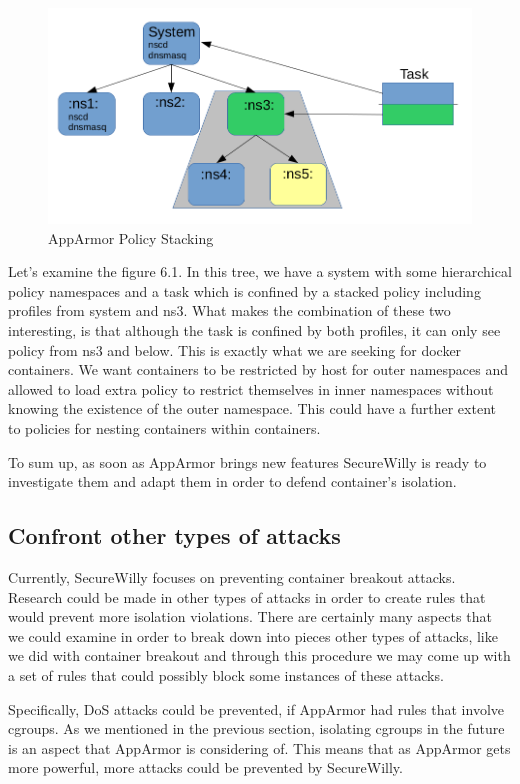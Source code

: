 \begin{figure}[h!]
  \centering
   \includegraphics[width=0.9\linewidth]{./figures/policystacking1.png}
   \caption{AppArmor Policy Stacking}
\end{figure}

Let's examine the figure 6.1. In this tree, we have a system with some hierarchical policy namespaces and a task which is confined by a stacked policy including profiles from system and ns3. What makes the combination of these two interesting, is that although the task is confined by both profiles, it can only see policy from ns3 and below. This is exactly what we are seeking for docker containers. We want containers to be restricted by host for outer namespaces and allowed to load extra policy to restrict themselves in inner namespaces without knowing the existence of the outer namespace.
This could have a further extent to policies for nesting containers within containers.
\hfil\break\hfil\break

To sum up, as soon as AppArmor brings new features SecureWilly is ready to investigate them and adapt them in order to defend container's isolation.

\subsection{Confront other types of attacks}
Currently, SecureWilly focuses on preventing container breakout attacks. Research could be made in other types of attacks in order to create rules that would prevent more isolation violations. There are certainly many aspects that we could examine in order to break down into pieces other types of attacks, like we did with container breakout and through this procedure we may come up with a set of rules that could possibly block some instances of these attacks.

Specifically, DoS attacks could be prevented, if AppArmor had rules that involve cgroups. As we mentioned in the previous section, isolating cgroups in the future is an aspect that AppArmor is considering of. This means that as AppArmor gets more powerful, more attacks could be prevented by SecureWilly.

